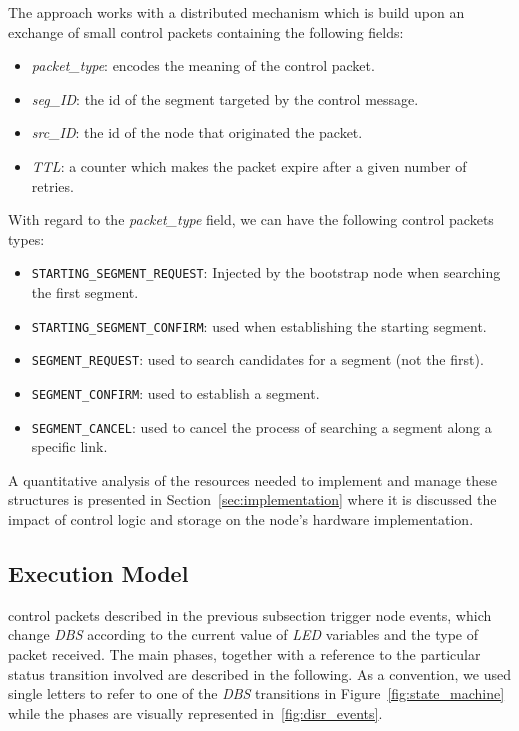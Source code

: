 The \disr{} approach works with a distributed mechanism which is build
upon an exchange of small control packets containing the following fields:
\begin{itemize}
\item \emph{packet\_type}: encodes the meaning of the control packet.
\item \emph{seg\_ID}: the id of the segment targeted by the \disr{} control message.
\item \emph{src\_ID}: the id of the node that originated the packet.
\item \emph{TTL}: a counter which makes the packet expire after a
given number of retries.
\end{itemize}

With regard to the \emph{packet\_type} field, we can have the following control packets types:
\begin{itemize}
\item{\texttt{STARTING\_SEGMENT\_REQUEST}}: Injected by the bootstrap
node when searching the first segment. 
\item{\texttt{STARTING\_SEGMENT\_CONFIRM}}: used when establishing
the starting segment. 
\item{\texttt{SEGMENT\_REQUEST}}: used to search candidates for a segment (not the first).
\item{\texttt{SEGMENT\_CONFIRM}}: used to establish a segment. 
\item{\texttt{SEGMENT\_CANCEL}}: used to cancel the process of searching a segment along a
specific link.
\end{itemize}

A quantitative analysis of the resources needed to implement and
manage these structures is presented in Section~\ref{sec:implementation} where it is discussed 
the impact of \disr{} control logic and storage on the
node's hardware implementation.

\subsection{Execution Model}
\label{sub:phases}

\disr{} control packets described in the previous subsection trigger
node events, which change \emph{DBS} according to the
current value of \emph{LED} variables and the type of packet received.
The main \disr{} phases, together with a reference to the particular
status transition involved are described in the following. As a
convention, we used single letters to refer to one of the \emph{DBS} transitions in
Figure~\ref{fig:state_machine} while the phases are visually
represented in~\ref{fig:disr_events}.

